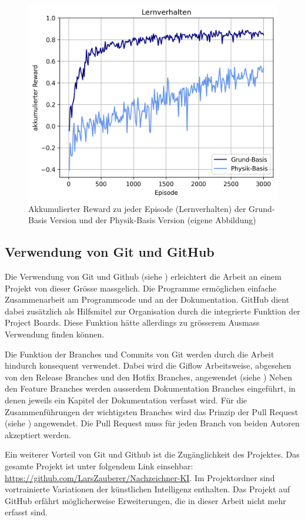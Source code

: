 \begin{figure}[!ht]
    \centering
    \includegraphics[width=\textwidth-2cm]{images/diskussion/learnplot.png}
    \caption{Akkumulierter Reward zu jeder Episode (Lernverhalten) der Grund-Basis Version und der Physik-Basis Version (eigene Abbildung)}
    \label{fig:learnplot}
\end{figure}


\subsection{Verwendung von Git und GitHub}\label{sub:d_reflex_git} Die
Verwendung von Git und Github (siehe ) erleichtert die
Arbeit an einem Projekt von dieser Grösse massgelich. Die Programme ermöglichen
einfache Zusammenarbeit am Programmcode und an der Dokumentation. GitHub dient
dabei zusätzlich als Hilfsmitel zur Organisation durch die integrierte Funktion
der Project Boards. Diese Funktion hätte allerdings zu grösserem Ausmass
Verwendung finden können.

Die Funktion der Branches und Commits von Git werden durch die Arbeit hindurch
konsequent verwendet. Dabei wird die Giflow Arbeitsweise, abgesehen von den
Release Branches und den Hotfix Branches, angewendet (siehe
) Neben den Feature Branches werden ausserdem
Dokumentation Branches eingeführt, in denen jeweils ein Kapitel der
Dokumentation verfasst wird. Für die Zusammenführungen der wichtigsten Branches
wird das Prinzip der Pull Request (siehe ) angewendet. Die
Pull Request muss für jeden Branch von beiden Autoren akzeptiert werden.

Ein weiterer Vorteil von Git und Github ist die Zugänglichkeit des Projektes.
Das gesamte Projekt ist unter folgendem Link einsehbar:
\url{https://github.com/LarsZauberer/Nachzeichner-KI}. Im Projektordner sind
vortrainierte Variationen der künstlichen Intelligenz enthalten. Das Projekt auf
GitHub erfährt möglicherweise Erweiterungen, die in dieser Arbeit nicht mehr
erfasst sind.
